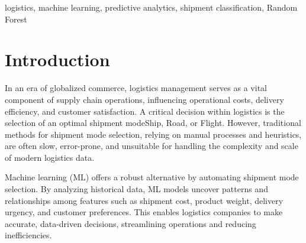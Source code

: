 \documentclass[conference]{IEEEtran}
\begin{document}
\maketitle

\begin{abstract}
The logistics industry underpins global trade and supply chains by determining the most efficient shipment modes\textemdash Ship, Road, or Flight. Optimal shipment mode selection directly influences costs, delivery timelines, and customer satisfaction. This study presents a data-driven predictive model leveraging machine learning algorithms to classify shipment modes based on transactional and product-specific features. The research employs Logistic Regression, Random Forest, and Gradient Boosting techniques, focusing on feature engineering, hyperparameter tuning, and model optimization. Random Forest emerged as the best-performing algorithm, achieving high accuracy and interpretability. This work demonstrates the transformative potential of machine learning in enhancing logistics operations, optimizing costs, and improving supply chain efficiency.
\end{abstract}

\begin{IEEEkeywords}
logistics, machine learning, predictive analytics, shipment classification, Random Forest
\end{IEEEkeywords}

\section{Introduction}
In an era of globalized commerce, logistics management serves as a vital component of supply chain operations, influencing operational costs, delivery efficiency, and customer satisfaction. A critical decision within logistics is the selection of an optimal shipment mode\textemdash Ship, Road, or Flight. However, traditional methods for shipment mode selection, relying on manual processes and heuristics, are often slow, error-prone, and unsuitable for handling the complexity and scale of modern logistics data.

Machine learning (ML) offers a robust alternative by automating shipment mode selection. By analyzing historical data, ML models uncover patterns and relationships among features such as shipment cost, product weight, delivery urgency, and customer preferences. This enables logistics companies to make accurate, data-driven decisions, streamlining operations and reducing inefficiencies.
\end{document}
